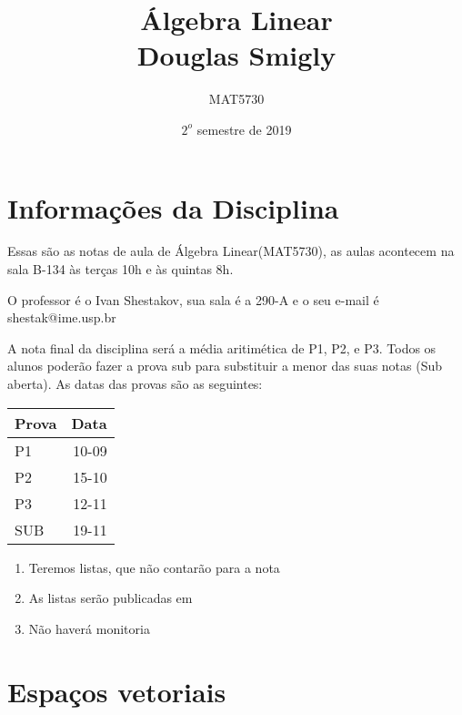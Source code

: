 \documentclass[11pt,twoside,a4paper]{book}
\title{Álgebra Linear \\  Douglas Smigly}
\author{MAT5730}
\date{$2^o$ semestre de 2019}
\begin{document}
\maketitle
\newpage
\tableofcontents
\newpage
\chapter*{Informações da Disciplina}
\label{sec:intro}
\label{new-question}

Essas são as notas de aula de Álgebra Linear(MAT5730), as aulas acontecem na sala B-134 às terças 10h e às quintas 8h.


O professor é o Ivan Shestakov, sua sala é a 290-A e o seu e-mail é shestak@ime.usp.br

\nocite{*}



A nota final da disciplina será a média aritimética de P1, P2, e P3. Todos os
alunos poderão fazer a prova sub para substituir a menor das suas notas (Sub
aberta). As datas das provas são as seguintes:

\begin{table}[h!]
\begin{center}

\label{tab:table1}
\begin{tabular}{l|r} %
\textbf{Prova} & \textbf{Data}\\
\hline
P1 & 10-09\\
P2 & 15-10\\
P3 & 12-11\\
SUB & 19-11
\end{tabular}
\end{center}
\end{table}

\begin{enumerate}[label=(\roman*)]
\item Teremos listas, que não contarão para a nota
\item As listas serão publicadas em 
\item Não haverá monitoria
\end{enumerate}
\newpage 

\chapter{Espaços vetoriais}
\end{document}
